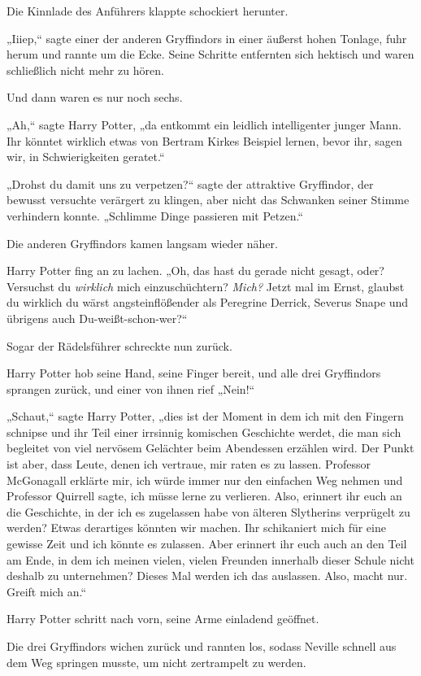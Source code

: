 {Die Kinnlade des Anführers klappte schockiert herunter.

„Iiiep,“ sagte einer der anderen Gryffindors in einer äußerst hohen Tonlage, fuhr herum und rannte um die Ecke. Seine Schritte entfernten sich hektisch und waren schließlich nicht mehr zu hören.

Und dann waren es nur noch sechs.

„Ah,“ sagte Harry Potter, „da entkommt ein leidlich intelligenter junger Mann. Ihr könntet wirklich etwas von Bertram Kirkes Beispiel lernen, bevor ihr, sagen wir, in Schwierigkeiten geratet.“

„Drohst du damit uns zu verpetzen?“ sagte der attraktive Gryffindor, der bewusst versuchte verärgert zu klingen, aber nicht das Schwanken seiner Stimme verhindern konnte. „Schlimme Dinge passieren mit Petzen.“

Die anderen Gryffindors kamen langsam wieder näher.

Harry Potter fing an zu lachen. „Oh, das hast du gerade nicht gesagt, oder? Versuchst du \emph{wirklich} mich einzuschüchtern? \emph{Mich?} Jetzt mal im Ernst, glaubst du wirklich du wärst angsteinflößender als Peregrine Derrick, Severus Snape und übrigens auch Du-weißt-schon-wer?“

Sogar der Rädelsführer schreckte nun zurück.

Harry Potter hob seine Hand, seine Finger bereit, und alle drei Gryffindors sprangen zurück, und einer von ihnen rief „Nein\later!“

„Schaut,“ sagte Harry Potter, „dies ist der Moment in dem ich mit den Fingern schnipse und ihr Teil einer irrsinnig komischen Geschichte werdet, die man sich begleitet von viel nervösem Gelächter beim Abendessen erzählen wird. Der Punkt ist aber, dass Leute, denen ich vertraue, mir raten es zu lassen. Professor McGonagall erklärte mir, ich würde immer nur den einfachen Weg nehmen und Professor Quirrell sagte, ich müsse lerne zu verlieren. Also, erinnert ihr euch an die Geschichte, in der ich es zugelassen habe von älteren Slytherins verprügelt zu werden? Etwas derartiges könnten wir machen. Ihr schikaniert mich für eine gewisse Zeit und ich könnte es zulassen. Aber erinnert ihr euch auch an den Teil am Ende, in dem ich meinen vielen, vielen Freunden innerhalb dieser Schule nicht deshalb zu unternehmen? Dieses Mal werden ich das auslassen. Also, macht nur. Greift mich an.“

Harry Potter schritt nach vorn, seine Arme einladend geöffnet.

Die drei Gryffindors wichen zurück und rannten los, sodass Neville schnell aus dem Weg springen musste, um nicht zertrampelt zu werden.

}
